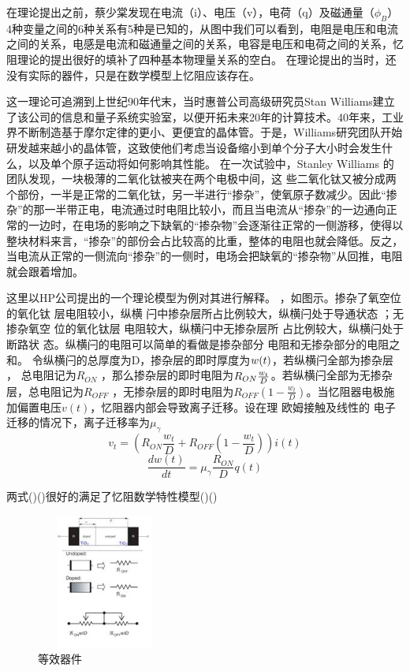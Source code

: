 \documentclass[UTF8]{article}
\begin{document}
在理论提出之前，蔡少棠发现在电流（i）、电压（v），电荷（q）及磁通量（$\phi_{B}$）4种变量之间的6种关系有5种是已知的，从图中我们可以看到，电阻是电压和电流之间的关系，电感是电流和磁通量之间的关系，电容是电压和电荷之间的关系，忆阻理论的提出很好的填补了四种基本物理量关系的空白。
在理论提出的当时，还没有实际的器件，只是在数学模型上忆阻应该存在。%

这一理论可追溯到上世纪90年代末，当时惠普公司高级研究员Stan Williams建立了该公司的信息和量子系统实验室，以便开拓未来20年的计算技术。40年来，工业界不断制造基于摩尔定律的更小、更便宜的晶体管。于是，Williams研究团队开始研发越来越小的晶体管，这致使他们考虑当设备缩小到单个分子大小时会发生什么，以及单个原子运动将如何影响其性能。
在一次试验中，Stanley Williams 的团队发现，一块极薄的二氧化钛被夹在两个电极中间，这
些二氧化钛又被分成两个部份，一半是正常的二氧化钛，另一半进行“掺杂”，使氧原子数减少。因此“掺杂”的那一半带正电，电流通过时电阻比较小，而且当电流从“掺杂”的一边通向正常的一边时，在电场的影响之下缺氧的“掺杂物”会逐渐往正常的一侧游移，使得以整块材料来言，“掺杂”的部份会占比较高的比重，整体的电阻也就会降低。反之，当电流从正常的一侧流向“掺杂”的一侧时，电场会把缺氧的“掺杂物”从回推，电阻就会跟着增加。


这里以HP公司提出的一个理论模型为例对其进行解释。
，如图示。掺杂了氧空位的氧化钛 层电阻较小，纵横 闩中掺杂层所占比例较大，纵横闩处于导通状态 ；无掺杂氧空 位的氧化钛层 电阻较大，纵横闩中无掺杂层所 占比例较大，纵横闩处于断路状 态。纵横闩的电阻可以简单的看做是掺杂部分 电阻和无掺杂部分的电阻之和。 令纵横闩的总厚度为D，掺杂层的即时厚度为$\mathnormal{w(t)}   $，若纵横闩全部为掺杂层 ， 总电阻记为$R_{ON}$ ，那么掺杂层的即时电阻为$R_{ON} \frac{\mathnormal{w_{t}}}{\mathnormal{D}}$。若纵横闩全部为无掺杂 层，总电阻记为$R_{OFF}$ ，无掺杂层的即时电阻为$R_{OFF}(1 - \frac{w_{t}}{D})$。当忆阻器电极施 加偏置电压$v(t)$，忆阻器内部会导致离子迁移。设在理 欧姆接触及线性的 电子迁移的情况下，离子迁移率为$\mu_{\gamma}$
\begin{equation}
v_{t} = (R_{ON} \frac{w_{t}}{D} + R_{OFF}(1 - \frac{w_{t}}{D}) ) i(t)
\end{equation}
\begin{equation}
\frac{dw(t)}{dt} = \mu_{\gamma}\frac{R_{ON}}{D}q(t)
\end{equation}

两式()()很好的满足了忆阻数学特性模型()()

\begin{figure}[htbp]
\centering
\includegraphics[width=1.77in,height=1.75in]{pic/no2.jpeg}

\caption{等效器件}
\label{fig:graph}
\end{figure}
\end{document}
